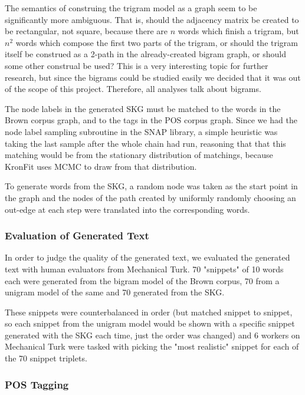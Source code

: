 \documentclass[12pt]{article}
\begin{document}
The semantics of construing the trigram model as a graph seem to be significantly more ambiguous. That is, should the adjacency matrix be created to be rectangular, not square, because there are $n$ words which finish a trigram, but $n^2$ words which compose the first two parts of the trigram, or should the trigram itself be construed as a 2-path in the already-created bigram graph, or should some other construal be used? This is a very interesting topic for further research, but since the bigrams could be studied easily we decided that it was out of the scope of this project. Therefore, all analyses talk about bigrams.

The node labels in the generated SKG must be matched to the words in the Brown corpus graph, and to the tags in the POS corpus graph. Since we had the node label sampling subroutine in the SNAP library, a simple heuristic was taking the last sample after the whole chain had run, reasoning that that this matching would be from the stationary distribution of matchings, because KronFit uses MCMC to draw from that distribution.

To generate words from the SKG, a random node was taken as the start point in the graph and the nodes of the path created by uniformly randomly choosing an out-edge at each step were translated into the corresponding words.



\subsubsection*{Evaluation of Generated Text}

In order to judge the quality of the generated text, we evaluated the generated text with human evaluators from Mechanical Turk. 70 "snippets" of 10 words each were generated from the bigram model of the Brown corpus, 70 from a unigram model of the same and 70 generated from the SKG.

These snippets were counterbalanced in order (but matched snippet to snippet, so each snippet from the unigram model would be shown with a specific snippet generated with the SKG each time, just the order was changed) and 6 workers on Mechanical Turk were tasked with picking the "most realistic" snippet for each of the 70 snippet triplets.

\subsubsection*{POS Tagging}
\end{document}
